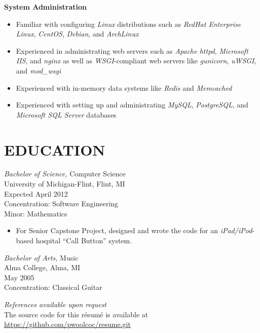 \documentclass[line,margin]{res}
\begin{document}
\begin{resume}
    \textbf{System Administration} \vspace{2 mm}
    \begin{itemize}
        \item Familiar with configuring {\sl Linux} distributions such as {\sl RedHat
              Enterprise Linux}, {\sl CentOS}, {\sl Debian}, and {\sl ArchLinux}
        \item Experienced in administrating web servers such as {\sl Apache httpd},
              {\sl Microsoft IIS}, and {\sl nginx} as well as
              {\sl WSGI}-compliant web servers like {\sl gunicorn},
              {\sl uWSGI}, and {\sl mod\_wsgi}
        \item Experienced with in-memory data systems like {\sl Redis} and {\sl Memcached}
        \item Experienced with setting up and administrating {\sl MySQL},
              {\sl PostgreSQL}, and {\sl Microsoft SQL Server} databases
    \end{itemize}



\section{EDUCATION} 
                {\sl Bachelor of Science,} Computer Science \\
                University of Michigan-Flint, Flint, MI \\
                Expected April 2012 \\
                Concentration: Software Engineering \\
                Minor: Mathematics
                \vspace{2 mm}
                \begin{itemize}
                    \item For Senior Capstone Project, designed and wrote 
                            the code for an {\sl iPad/iPod}-based hospital
                            ``Call Button'' system.
                \end{itemize}

                {\sl Bachelor of Arts,} Music \\
                Alma College, Alma, MI \\
                May 2005 \\
                Concentration: Classical Guitar

\vspace{15 mm}


\end{resume}

\begin{flushleft}
{\sl References available upon request} \\
\vspace{10 mm}
The source code for this r\'{e}sum\'{e} is available at
\href{https://github.com/pwoolcoc/resume.git}{https://github.com/pwoolcoc/resume.git}
\end{flushleft}
\end{document}
